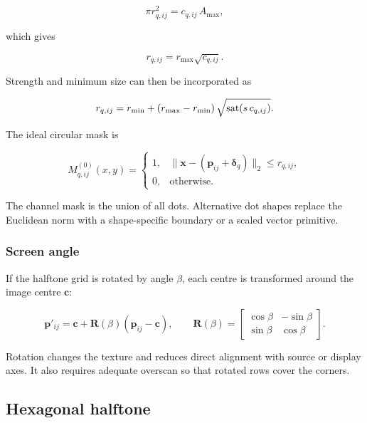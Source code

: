 \begin{equation}
\pi r_{q,ij}^{2}=c_{q,ij}\,A_{\max},
\end{equation}

which gives

\begin{equation}
r_{q,ij}=r_{\max}\sqrt{c_{q,ij}}.
\label{eq:radiusarea}
\end{equation}

Strength and minimum size can then be incorporated as

\begin{equation}
r_{q,ij}=r_{\min}+
\left(r_{\max}-r_{\min}\right)
\sqrt{\operatorname{sat}\!\left(s\,c_{q,ij}\right)}.
\label{eq:radiusfinal}
\end{equation}

The ideal circular mask is

\begin{equation}
M_{q,ij}^{(0)}(x,y)=
\begin{cases}
1,&\|\mathbf{x}-(\mathbf{p}_{ij}+\boldsymbol{\delta}_q)\|_2\le r_{q,ij},\\
0,&\text{otherwise.}
\end{cases}
\label{eq:dotmask}
\end{equation}

The channel mask is the union of all dots. Alternative dot shapes replace the Euclidean norm with a shape-specific boundary or a scaled vector primitive.

\subsubsection{Screen angle}

If the halftone grid is rotated by angle $\beta$, each centre is transformed around the image centre $\mathbf{c}$:

\begin{equation}
\mathbf{p}'_{ij}=\mathbf{c}+\mathbf{R}(\beta)(\mathbf{p}_{ij}-\mathbf{c}),
\qquad
\mathbf{R}(\beta)=
\begin{bmatrix}
\cos\beta&-\sin\beta\\
\sin\beta&\cos\beta
\end{bmatrix}.
\end{equation}

Rotation changes the texture and reduces direct alignment with source or display axes. It also requires adequate overscan so that rotated rows cover the corners.

\subsection{Hexagonal halftone}

